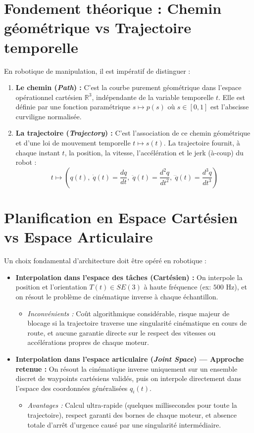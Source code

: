 \documentclass[11pt,a4paper]{report}
\begin{document}
\section{Fondement théorique : Chemin géométrique vs Trajectoire temporelle}
En robotique de manipulation, il est impératif de distinguer :
\begin{enumerate}
    \item \textbf{Le chemin (\textit{Path}) :} C'est la courbe purement géométrique dans l'espace opérationnel cartésien $\mathbb{R}^3$, indépendante de la variable temporelle $t$. Elle est définie par une fonction paramétrique $s \mapsto p(s)$ où $s \in [0, 1]$ est l'abscisse curviligne normalisée.
    \item \textbf{La trajectoire (\textit{Trajectory}) :} C'est l'association de ce chemin géométrique et d'une loi de mouvement temporelle $t \mapsto s(t)$. La trajectoire fournit, à chaque instant $t$, la position, la vitesse, l'accélération et le jerk (à-coup) du robot :
    \begin{equation}
        t \longmapsto \left( q(t), \; \dot{q}(t) = \frac{dq}{dt}, \; \ddot{q}(t) = \frac{d^2q}{dt^2}, \; \dddot{q}(t) = \frac{d^3q}{dt^3} \right)
    \end{equation}
\end{enumerate}

\section{Planification en Espace Cartésien vs Espace Articulaire}
Un choix fondamental d'architecture doit être opéré en robotique :
\begin{itemize}
    \item \textbf{Interpolation dans l'espace des tâches (Cartésien) :} On interpole la position et l'orientation $T(t) \in SE(3)$ à haute fréquence (ex: $500\text{ Hz}$), et on résout le problème de cinématique inverse à chaque échantillon. 
    \begin{itemize}
        \item \textit{Inconvénients :} Coût algorithmique considérable, risque majeur de blocage si la trajectoire traverse une singularité cinématique en cours de route, et aucune garantie directe sur le respect des vitesses ou accélérations propres de chaque moteur.
    \end{itemize}
    \item \textbf{Interpolation dans l'espace articulaire (\textit{Joint Space}) — Approche retenue :} On résout la cinématique inverse uniquement sur un ensemble discret de waypoints cartésiens validés, puis on interpole directement dans l'espace des coordonnées généralisées $q_i(t)$.
    \begin{itemize}
        \item \textit{Avantages :} Calcul ultra-rapide (quelques millisecondes pour toute la trajectoire), respect garanti des bornes de chaque moteur, et absence totale d'arrêt d'urgence causé par une singularité intermédiaire.
    \end{itemize}
\end{itemize}
\end{document}
